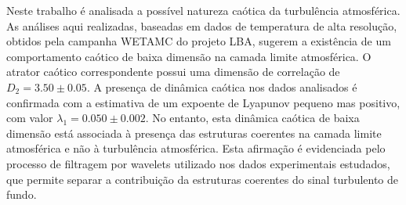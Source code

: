 
\begin{resumo}


\hypertarget{estilo:resumo}{} %

Neste trabalho é analisada a possível natureza caótica da turbulência atmosférica. As análises aqui realizadas, baseadas em dados de temperatura de alta resolução, obtidos pela campanha WETAMC do projeto LBA, sugerem a existência de um comportamento caótico de baixa dimensão na camada limite atmosférica. O atrator caótico correspondente possui uma dimensão de correlação de $D_{2}=3.50\pm0.05$. A presença de dinâmica caótica nos dados analisados é confirmada com a estimativa de um expoente de Lyapunov pequeno mas positivo, com valor $\lambda_{1}=0.050\pm0.002$. No entanto, esta dinâmica caótica de baixa dimensão está associada à presença das estruturas coerentes na camada limite atmosférica e não à turbulência atmosférica. Esta afirmação é evidenciada pelo processo de filtragem por wavelets utilizado nos dados experimentais estudados, que permite separar a contribuição da estruturas coerentes do sinal turbulento de fundo.

 
\end{resumo}